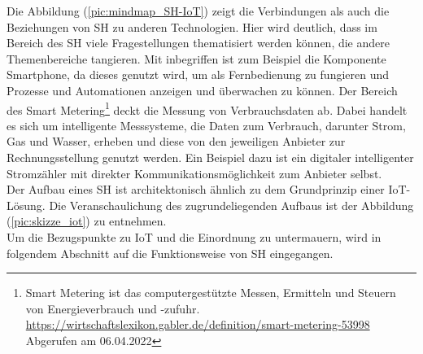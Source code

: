         Die Abbildung (\ref{pic:mindmap_SH-IoT}) zeigt die Verbindungen als auch die Beziehungen von \acl{SH} 
        zu anderen Technologien. Hier wird deutlich, dass im Bereich des \acl{SH} viele Fragestellungen 
        thematisiert werden können, die andere Themenbereiche tangieren. Mit inbegriffen ist zum Beispiel die 
        Komponente Smartphone, da dieses genutzt wird, um als Fernbedienung zu fungieren und Prozesse und 
        Automationen anzeigen und überwachen zu können. Der Bereich des Smart Metering\footnote{Smart Metering ist das computergestützte Messen, Ermitteln und Steuern von Energieverbrauch und -zufuhr. \url{https://wirtschaftslexikon.gabler.de/definition/smart-metering-53998} Abgerufen am 06.04.2022} 
        deckt die Messung von Verbrauchsdaten ab. Dabei handelt es sich um intelligente Messsysteme, die 
        Daten zum Verbrauch, darunter Strom, Gas und Wasser, erheben und diese von den jeweiligen Anbieter zur 
        Rechnungsstellung genutzt werden. Ein Beispiel dazu ist ein digitaler intelligenter Stromzähler mit 
        direkter Kommunikationsmöglichkeit zum Anbieter selbst.
        \\
        \linebreak
        Der Aufbau eines \acl{SH} ist architektonisch ähnlich zu dem Grundprinzip einer \acs{IoT}-Lösung. Die 
        Veranschaulichung des zugrundeliegenden Aufbaus ist der Abbildung (\ref{pic:skizze_iot}) zu entnehmen. 
        \\
        Um die Bezugspunkte zu \acs{IoT} und die Einordnung zu untermauern, wird in folgendem Abschnitt auf 
        die Funktionsweise von \acl{SH} eingegangen. 

